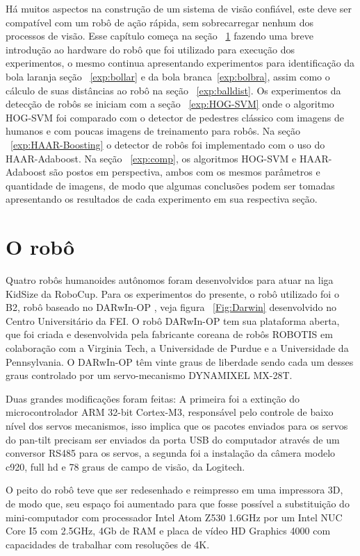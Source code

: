 

Há muitos aspectos na construção de um sistema de visão confiável, este deve ser compatível com um robô de ação rápida, sem sobrecarregar nenhum dos processos de visão. 
Esse capítulo começa na seção ~\ref{exp:robo} fazendo uma breve introdução ao hardware do robô que foi utilizado para execução dos experimentos, o mesmo continua apresentando experimentos para identificação da bola laranja seção ~\ref{exp:bollar} e da bola branca~\ref{exp:bolbra}, assim como o cálculo de suas distâncias ao robô na seção ~\ref{exp:balldist}. Os experimentos da detecção de robôs se iniciam com a seção ~\ref{exp:HOG-SVM} onde o algoritmo  HOG-SVM foi comparado com o detector de pedestres clássico com imagens de humanos e com poucas imagens de treinamento para robôs. Na seção ~\ref{exp:HAAR-Boosting} o detector de robôs foi implementado com o uso do HAAR-Adaboost. Na seção ~\ref{exp:comp}, os algoritmos HOG-SVM e HAAR-Adaboost são postos em perspectiva, ambos com os mesmos parâmetros e quantidade de imagens, de modo que algumas conclusões podem ser tomadas apresentando os resultados de cada experimento em sua respectiva seção.

\section{O robô}
\label{exp:robo}
Quatro robôs humanoides autônomos foram desenvolvidos para atuar na liga KidSize da RoboCup. Para os experimentos do presente, o robô utilizado foi o B2, robô baseado no DARwIn-OP \cite{Darwin}, veja figura ~\ref{Fig:Darwin} desenvolvido no Centro Universitário da FEI. O robô DARwIn-OP tem sua plataforma aberta, que foi criada e desenvolvida pela fabricante coreana de robôs ROBOTIS em colaboração com a Virginia Tech, a Universidade de Purdue e a Universidade da Pennsylvania. O DARwIn-OP têm vinte graus de liberdade sendo cada um desses graus controlado por um servo-mecanismo DYNAMIXEL MX-28T.

Duas grandes modificações foram feitas: A primeira foi a extinção do microcontrolador ARM 32-bit Cortex-M3, responsável pelo controle de baixo nível dos servos mecanismos, isso implica que os pacotes enviados para os servos do pan-tilt precisam ser enviados da porta USB do computador através de um conversor RS485 para os servos, a segunda foi a instalação da câmera modelo c920, full hd e 78 graus de campo de visão, da Logitech. 

O peito do robô teve que ser redesenhado e reimpresso em uma impressora 3D, de modo que, seu espaço foi aumentado para que fosse possível a substituição do mini-computador com processador Intel Atom Z530 1.6GHz por um Intel NUC Core I5 com 2.5GHz, 4Gb de RAM e placa de vídeo HD Graphics 4000 com capacidades de trabalhar com resoluções de 4K.

